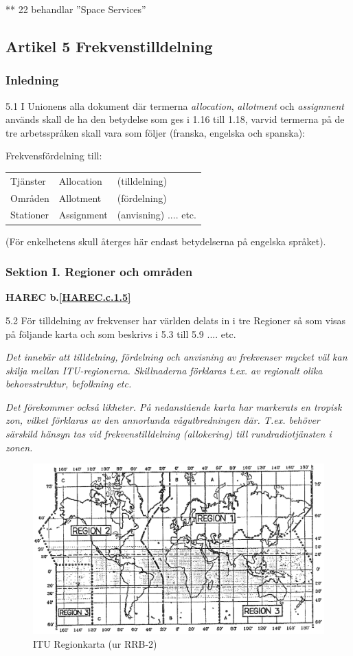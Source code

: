 ** 22 behandlar ''Space Services''

\subsection{Artikel 5 Frekvenstilldelning}

\subsubsection{Inledning}

5.1 I Unionens alla dokument där termerna \emph{allocation},
\emph{allotment} och \emph{assignment} används skall de ha den
betydelse som ges i 1.16 till 1.18, varvid termerna på de tre
arbetsspråken skall vara som följer (franska, engelska och spanska):
\cite[5.1]{ITU-RR}

Frekvensfördelning till:
\begin{tabular}{lll}
  Tjänster & Allocation & (tilldelning) \\
  Områden & Allotment & (fördelning) \\
  Stationer & Assignment & (anvisning) .... etc. \\
\end{tabular}

(För enkelhetens skull återges här endast betydelserna på engelska språket).

\subsubsection{Sektion I. Regioner och områden}
\textbf{
HAREC b.\ref{HAREC.c.1.5}\label{myHAREC.c.1.5}
}

5.2 För tilldelning av frekvenser har världen delats in i tre
Regioner så som visas på följande karta och som beskrivs i 5.3 till
5.9 .... etc.
\cite[5.2]{ITU-RR}

\emph{ Det innebär att tilldelning, fördelning och anvisning av
  frekvenser mycket väl kan skilja mellan ITU-regionerna. Skillnaderna
  förklaras t.ex. av regionalt olika behovsstruktur, befolkning etc.}

\emph{Det förekommer också likheter. På nedanstående karta har
  markerats en tropisk zon, vilket förklaras av den annorlunda
  vågutbredningen där. T.ex. behöver särskild hänsyn tas vid
  frekvenstilldelning (allokering) till rundradiotjänsten i zonen.}

\begin{figure}
  \includegraphics[width=\textwidth]{images/cropped_pdfs/bild_3_2-01.pdf}
  \caption{ITU Regionkarta (ur RRB-2)}
  \label{fig:bildIII2-1}
\end{figure}
